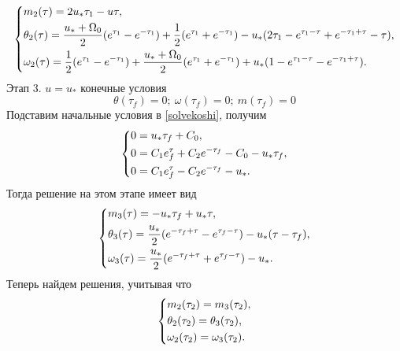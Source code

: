 \documentclass[a4paper,14pt]{article}
\theoremstyle{plain} %
\theoremstyle{definition} %
\theoremstyle{remark} %
\begin{document}
{\[
    \left\{ {\begin{aligned}
                 & m_2(\tau) = 2u_*\tau_1-u\tau, \hfill                                                                                                                            \\
                 & \theta_2(\tau) = \frac{u_*+\Omega_0}{2}(e^{\tau_1}-e^{-\tau_1})+\frac{1}{2}(e^{\tau_1}+e^{-\tau_1})-u_*(2\tau_1-e^{\tau_1-\tau}+e^{-\tau_1+\tau}-\tau) , \hfill \\
                 & \omega_2(\tau) = \frac{1}{2}(e^{\tau_1}-e^{-\tau_1})+\frac{u_*+\Omega_0}{2}(e^{\tau_1}+e^{-\tau_1})+u_*(1-e^{\tau_1-\tau}-e^{-\tau_1+\tau})  . \hfill           \\
            \end{aligned}} \right.
\]
Этап 3. $u=u_*$ конечные условия
\[
    \theta(\tau_f)=0;\ \omega(\tau_f)=0;\ m(\tau_f)=0
\]
Подставим начальные условия в \eqref{solvekoshi}, получим
\[
    \left\{ {\begin{aligned}
                 & 0 = u_*\tau_f+C_0, \hfill                             \\
                 & 0 = C_1e^\tau_f+C_2e^{-\tau_f}-C_0-u_*\tau_f , \hfill \\
                 & 0 = C_1e^\tau_f-C_2e^{-\tau_f}-u_*  . \hfill          \\
            \end{aligned}} \right.
\]
Тогда решение на этом этапе имеет вид
\[
    \left\{ {\begin{aligned}
                 & m_3(\tau) = -u_*\tau_f+u_*\tau, \hfill                                                    \\
                 & \theta_3(\tau) = \frac{u_*}{2}(e^{-\tau_f+\tau}-e^{\tau_f-\tau})-u_*(\tau-\tau_f), \hfill \\
                 & \omega_3(\tau) = \frac{u_*}{2}(e^{-\tau_f+\tau}+e^{\tau_f-\tau})-u_*  . \hfill            \\
            \end{aligned}} \right.
\]
Теперь найдем решения, учитывая что
\[
    \left\{ {\begin{aligned}
                 & m_2(\tau_2) = m_3(\tau_2), \hfill            \\
                 & \theta_2(\tau_2) =  \theta_3(\tau_2), \hfill \\
                 & \omega_2(\tau_2) = \omega_3(\tau_2) . \hfill \\
            \end{aligned}} \right.
\]}
\end{document}
